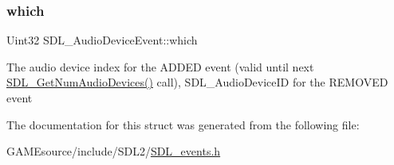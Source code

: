 \subsubsection{\texorpdfstring{which}{which}}
{\footnotesize\ttfamily Uint32 S\+D\+L\+\_\+\+Audio\+Device\+Event\+::which}

The audio device index for the A\+D\+D\+ED event (valid until next \mbox{\hyperlink{_s_d_l__audio_8h_ae165f64b3f0fecfebe1c97731600ca59}{S\+D\+L\+\_\+\+Get\+Num\+Audio\+Devices()}} call), S\+D\+L\+\_\+\+Audio\+Device\+ID for the R\+E\+M\+O\+V\+ED event 

The documentation for this struct was generated from the following file\+:\begin{DoxyCompactItemize}
\item 
G\+A\+M\+Esource/include/\+S\+D\+L2/\mbox{\hyperlink{_s_d_l__events_8h}{S\+D\+L\+\_\+events.\+h}}\end{DoxyCompactItemize}

